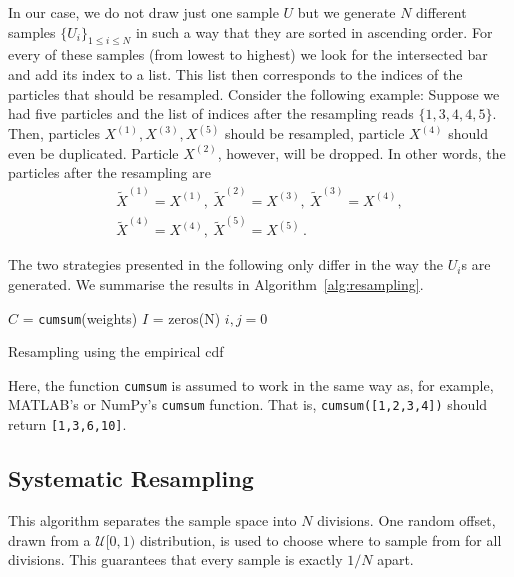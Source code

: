In our case, we do not draw just one sample $U$ but we generate $N$
different samples $\{U_i\}_{1 \le i \le N}$ in such a way that they
are sorted in ascending order. For every of these samples (from lowest
to highest) we look for the intersected bar and add its index to a
list. This list then corresponds to the indices of the particles that
should be resampled. Consider the following example: Suppose we had
five particles and the list of indices after the resampling reads
$\{1,3,4,4,5\}$. Then, particles $X^{(1)},X^{(3)},X^{(5)}$ should be
resampled, particle $X^{(4)}$ should even be duplicated. Particle
$X^{(2)}$, however, will be dropped. In other words, the particles
after the resampling are
\begin{gather*}
  \tilde{X}^{(1)}=X^{(1)},\ \tilde{X}^{(2)}=X^{(3)},\ \tilde{X}^{(3)}=X^{(4)},\\
  \tilde{X}^{(4)}=X^{(4)},\ \tilde{X}^{(5)}=X^{(5)}\,.
\end{gather*}

The two strategies presented in the following only differ in the way
the $U_i$s are generated. We summarise the results in
Algorithm~\ref{alg:resampling}.

\begin{algorithm}[htpb]
  \SetAlgoLined \KwData{$N$ samples $U_i \sim \mathcal{U}(0, 1]$
    sorted in ascending order;\ list of weights}  $C$ =
  \texttt{cumsum}(weights)  $I$ = zeros(N)\; $i,j = 0$\; 
  \caption{Resampling using the empirical cdf}\label{alg:resampling}
\end{algorithm}

Here, the function \texttt{cumsum} is assumed to work in the same way
as, for example, MATLAB's or NumPy's \texttt{cumsum} function. That
is, \texttt{cumsum([1,2,3,4])} should return \texttt{[1,3,6,10]}.

\subsection*{Systematic Resampling}
This algorithm separates the sample space into $N$ divisions. One
random offset, drawn from a $\mathcal{U}[0, 1)$ distribution, is used
to choose where to sample from for all divisions. This guarantees that
every sample is exactly $1/N$ apart.

